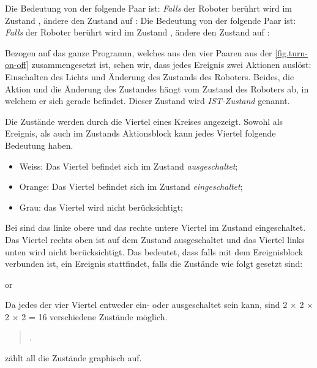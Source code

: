 Die Bedeutung von der folgende Paar ist: \emph{Falls} der Roboter berührt wird
im Zustand , ändere den Zustand auf :
Die Bedeutung von der folgende Paar ist: \emph{Falls} der Roboter berührt wird im Zustand , ändere den Zustand auf : 

Bezogen auf das ganze Programm, welches aus den vier Paaren aus der \cref{fig.turn-on-off}  zusammengesetzt ist, sehen wir, dass jedes Ereignis zwei Aktionen auslöst: Einschalten des Lichts und Änderung des Zustands des Roboters. Beides, die Aktion und die Änderung des Zustandes hängt vom Zustand des Roboters ab, in welchem er sich gerade befindet. Dieser Zustand wird \emph{IST-Zustand} genannt.


Die Zustände werden durch die Viertel eines Kreises angezeigt. Sowohl als Ereignis, als auch im Zustands Aktionsblock kann jedes Viertel folgende Bedeutung haben. 
\begin{itemize}

\item Weiss: Das Viertel befindet sich im Zustand \emph{ausgeschaltet};
\item Orange: Das Viertel befindet sich im Zustand \emph{eingeschaltet};
\item Grau: das Viertel wird nicht berücksichtigt;

\end{itemize}

Bei  sind das linke obere und das rechte untere Viertel im Zustand eingeschaltet. Das Viertel rechts oben ist auf dem Zustand ausgeschaltet und das Viertel links unten wird nicht berücksichtigt. Das bedeutet, dass falls  mit dem Ereignisblock verbunden ist, ein Ereignis stattfindet, falls die Zustände wie folgt gesetzt sind:

\begin{center}
\centering {}\quad or \quad {}
\end{center}

Da jedes der vier Viertel entweder ein- oder ausgeschaltet sein kann, sind 2 $\times$ 2 $\times$ 2 $\times$ 2 = 16 verschiedene Zustände möglich.

\begin{quote}
.
\end{quote}
 zählt all die Zustände graphisch auf. 

